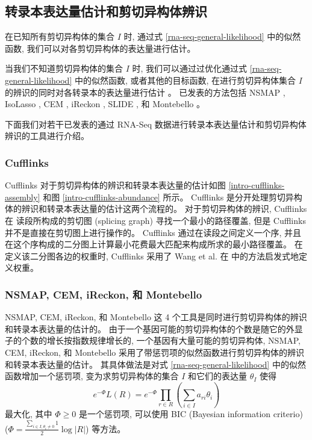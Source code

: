 \subsection{转录本表达量估计和剪切异构体辨识}
在已知所有剪切异构体的集合 $I$ 时, 通过式 \eqref{rna-seq-general-likelihood} 中的似然函数, 
我们可以对各剪切异构体的表达量进行估计。 

当我们不知道剪切异构体的集合 $I$ 时, 
我们可以通过过优化通过式 \eqref{rna-seq-general-likelihood} 中的似然函数, 
或者其他的目标函数, 在进行剪切异构体集合 $I$ 的辨识的同时对各转录本的表达量进行估计 
\cite{xing2006expectation}。 
已发表的方法包括 NSMAP \cite{nsmap.21575225}, 
IsoLasso \cite{isolasso.recomb}, 
CEM \cite{Li15112012}, 
iReckon \cite{Mezlini29112012}, 
SLIDE \cite{Li13122011}, 和 
Montebello \cite{Hiller.Montebello}。

下面我们对若干已发表的通过 RNA-Seq 数据进行转录本表达量估计和剪切异构体辨识的工具进行介绍。 

\subsubsection{Cufflinks}
Cufflinks 对于剪切异构体的辨识和转录本表达量的估计如图 \ref{intro-cufflinks-assembly} 
和图 \ref{intro-cufflinks-abundance} 所示。 
Cufflinks 是分开处理剪切异构体的辨识和转录本表达量的估计这两个流程的。 
对于剪切异构体的辨识, Cufflinks 在 读段所构成的剪切图 
(splicing graph) \cite{Heber01072002} 寻找一个最小的路径覆盖, 
但是 Cufflinks 并不是直接在剪切图上进行操作的。 
Cufflinks 通过在读段之间定义一个序, 
并且在这个序构成的二分图上计算最小花费最大匹配来构成所求的最小路径覆盖。 
在定义该二分图各边的权重时, Cufflinks 采用了 Wang et al. 在  
中的方法启发式地定义权重。

\subsubsection{NSMAP, CEM, iReckon, 和 Montebello}
\label{intro-nsmap-cem-ireckon-montebllo}

NSMAP, CEM, iReckon, 和 Montebello 这 4 个工具是同时进行剪切异构体的辨识和转录本表达量的估计的。 
由于一个基因可能的剪切异构体的个数是随它的外显子的个数的增长按指数规律增长的, 
一个基因有大量可能的剪切异构体, 
NSMAP, CEM, iReckon, 和 Montebello 
采用了带惩罚项的似然函数进行剪切异构体的辨识和转录本表达量的估计。 
其具体做法是对式 \eqref{rna-seq-general-likelihood} 中的似然函数增加一个惩罚项, 
变为求剪切异构体的集合 $I$ 和它们的表达量 $\theta_I$ 使得
\begin{equation}
e^{-\Phi} L(R) = 
e^{-\Phi}\prod_{r \in R} (\sum_{i \in I} a_{ri} \theta_i)
\end{equation}
最大化, 其中 $\Phi \geq 0$ 是一个惩罚项, 可以使用 BIC (Bayesian information criterio) \cite{BIC.Schwarz_1978}  
($\Phi = \frac{\sum_{i \in I, \theta_i\neq 0} 1}{2} \log |R|$) 等方法。

